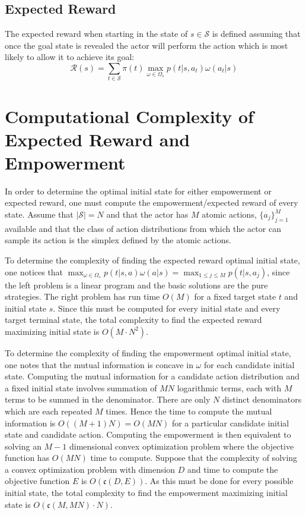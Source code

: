 \documentclass{article}
\newcommand{\Ss}{\mathcal{S}}
\newcommand{\Rr}{\mathcal{R}}
\begin{document}
\subsection{Expected Reward}
The expected reward when starting in the state of $s\in\mathcal{S}$ is defined assuming that once the goal state is revealed the actor will perform the action which is most likely to allow it to achieve its goal:
\[\Rr(s) = \sum_{t\in\Ss} \pi(t) \max_{\omega\in\Omega_s} p(t|s,a_t)\omega(a_t|s)\]
\section{Computational Complexity of Expected Reward and Empowerment}
In order to determine the optimal initial state for either empowerment or expected reward, one must compute the empowerment/expected reward of every state. Assume that $|\Ss|=N$ and that the actor has $M$ atomic actions, $\{a_j\}_{j=1}^M$ available and that the class of action distributions from which the actor can sample its action is the simplex defined by the atomic actions. 

To determine the complexity of finding the expected reward optimal initial state, one notices that $\max_{\omega\in\Omega_s} p(t|s,a)\omega(a|s) = \max_{1\leq j \leq M} p(t|s,a_j)$, since the left problem is a linear program and the basic solutions are the pure strategies. The right problem has run time $O(M)$ for a fixed target state $t$ and initial state $s$. Since this must be computed for every initial state and every target terminal state, the total complexity to find the expected reward maximizing initial state is $O(M\cdot N^2)$. 

To determine the complexity of finding the empowerment optimal initial state, one notes that the mutual information is concave \cite{braverman2011information} in $\omega$ for each candidate initial state. Computing the mutual information for a candidate action distribution and a fixed initial state involves summation of $MN$ logarithmic terms, each with $M$ terms to be summed in the denominator. There are only $N$ distinct denominators which are each repeated $M$ times. Hence the time to compute the mutual information is $O((M+1)N)=O(MN)$ for a particular candidate initial state and candidate action. Computing the empowerment is then equivalent to solving an $M-1$ dimensional convex optimization problem where the objective function has $O(MN)$ time to compute.  Suppose that the complexity of solving a convex optimization problem with dimension $D$ and time to compute the objective function $E$ is $O(\mathfrak{c}(D,E))$. As this must be done for every possible initial state, the total complexity to find the empowerment maximizing initial state is $O(\mathfrak{c}(M,MN)\cdot N)$. 
\end{document}
